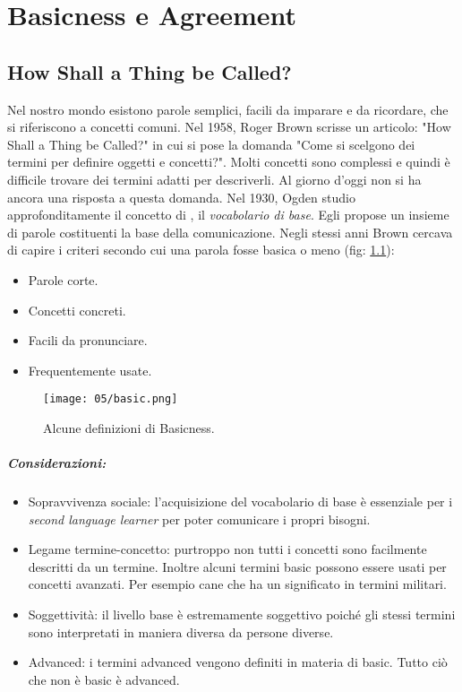 \chapter{Basicness e Agreement}
\section{How Shall a Thing be Called?}

Nel nostro mondo esistono parole semplici, facili da imparare e da ricordare, che si riferiscono a concetti comuni. Nel 1958, Roger Brown scrisse un articolo: "How Shall a Thing be Called?" in cui si pose la domanda "Come si scelgono dei termini per definire oggetti e concetti?". Molti concetti sono complessi e quindi è difficile trovare dei termini adatti per descriverli. Al giorno d'oggi non si ha ancora una risposta a questa domanda. Nel 1930, Ogden studio approfonditamente il concetto di , il \textit{vocabolario di base}. Egli propose un insieme di parole costituenti la base della comunicazione. Negli stessi anni Brown cercava di capire i criteri secondo cui una parola fosse basica o meno (fig: \ref{fig:bas}):

\begin{itemize}
  \item Parole corte. 
  \item Concetti concreti. 
  \item Facili da pronunciare. 
  \item Frequentemente usate. 
\end{itemize}
\begin{figure}[h]
    \centering
    \texttt{[image: 05/basic.png]}
    \caption{Alcune definizioni di Basicness.}
    \label{fig:bas}
\end{figure}

\paragraph{Considerazioni:}

\begin{itemize}
  \item Sopravvivenza sociale: l'acquisizione del vocabolario di base è essenziale per i \textit{second language learner} per poter comunicare i propri bisogni. 
  \item Legame termine-concetto: purtroppo non tutti i concetti sono facilmente descritti da un termine. Inoltre alcuni termini basic possono essere usati per concetti avanzati. Per esempio cane che ha un significato in termini militari. 
  \item Soggettività: il livello base è estremamente soggettivo poiché gli stessi termini sono interpretati in maniera diversa da persone diverse. 
  \item Advanced: i termini advanced vengono definiti in materia di basic. Tutto ciò che non è basic è advanced. 
\end{itemize}

